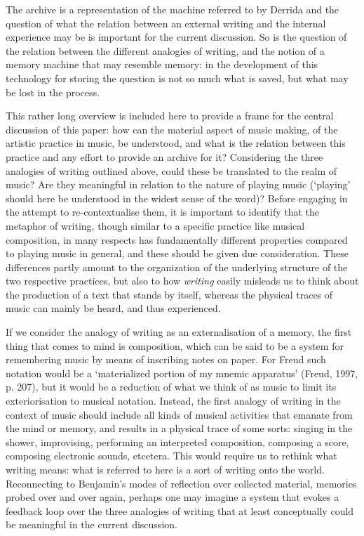 The archive is a representation of the machine referred to by Derrida
and the question of what the relation between an external writing and
the internal experience may be is important for the current discussion.
So is the question of the relation between the different analogies of
writing, and the notion of a memory machine that may resemble memory: in
the development of this technology for storing the question is not so
much what is saved, but what may be lost in the process.

This rather long overview is included here to provide a frame for the
central discussion of this paper: how can the material aspect of music
making, of the artistic practice in music, be understood, and what is
the relation between this practice and any effort to provide an archive
for it? Considering the three analogies of writing outlined above, could
these be translated to the realm of music? Are they meaningful in
relation to the nature of playing music (`playing' should here be
understood in the widest sense of the word)? Before engaging in the
attempt to re-contextualise them, it is important to identify that the
metaphor of writing, though similar to a specific practice like musical
composition, in many respects has fundamentally different properties
compared to playing music in general, and these should be given due
consideration. These differences partly amount to the organization of
the underlying structure of the two respective practices, but also to
how \emph{writing} easily misleads us to think about the production of a
text that stands by itself, whereas the physical traces of music can
mainly be heard, and thus experienced.

If we consider the analogy of writing as an externalisation of a memory,
the first thing that comes to mind is composition, which can be said to
be a system for remembering music by means of inscribing notes on paper.
For Freud such notation would be a `materialized portion of my mnemic
apparatus' (Freud, 1997, p. 207), but it would be a reduction of what we
think of as music to limit its exteriorisation to musical notation.
Instead, the first analogy of writing in the context of music should
include all kinds of musical activities that emanate from the mind or
memory, and results in a physical trace of some sorts: singing in the
shower, improvising, performing an interpreted composition, composing a
score, composing electronic sounds, etcetera. This would require us to
rethink what writing means: what is referred to here is a sort of
writing onto the world. Reconnecting to Benjamin's modes of reflection
over collected material, memories probed over and over again, perhaps
one may imagine a system that evokes a feedback loop over the three
analogies of writing that at least conceptually could be meaningful in
the current discussion.

